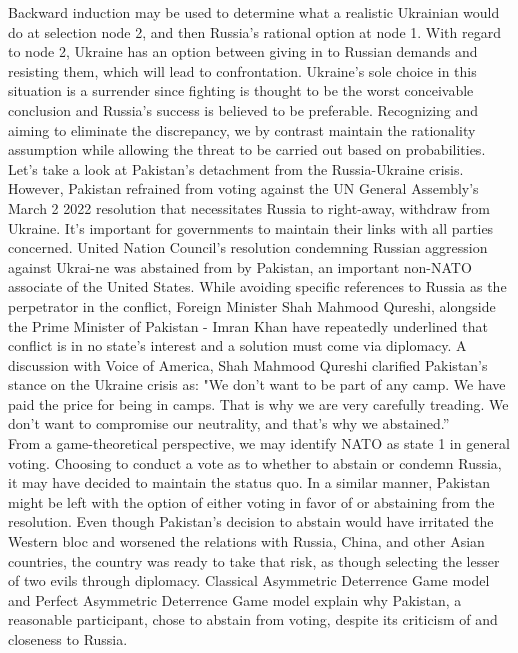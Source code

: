 \documentclass[runningheads]{llncs}
\begin{document}
Backward induction may be used to determine what a realistic Ukrainian would do at selection node 2, and then Russia's rational option at node 1. With regard to node 2, Ukraine has an option between giving in to Russian demands and resisting them, which will lead to confrontation. Ukraine's sole choice in this situation is a surrender since fighting is thought to be the worst conceivable conclusion and Russia's success is believed to be preferable. Recognizing and aiming to eliminate the discrepancy, we by contrast maintain the rationality assumption while allowing the threat to be carried out based on probabilities.\\
Let's take a look at Pakistan's detachment from the Russia-Ukraine crisis. However, Pakistan refrained from voting against the UN General Assembly's March 2 2022 resolution that necessitates Russia to right-away, withdraw from Ukraine. It's important for governments to maintain their links with all parties concerned. United Nation Council's resolution condemning Russian aggression against Ukrai-ne was abstained from by Pakistan, an important non-NATO associate of the United States. While avoiding specific references to Russia as the perpetrator in the conflict, Foreign Minister Shah Mahmood Qureshi, alongside the Prime Minister of Pakistan - Imran Khan have repeatedly underlined that conflict is in no state's interest and a solution must come via diplomacy. A discussion with Voice of America, Shah Mahmood Qureshi clarified Pakistan's stance on the Ukraine crisis as: "We don't want to be part of any camp. We have paid the price for being in camps. That is why we are very carefully treading. We don’t want to compromise our neutrality, and that’s why we abstained.” \\
From a game-theoretical perspective, we may identify NATO as state 1 in general voting. Choosing to conduct a vote as to whether to abstain or condemn Russia, it may have decided to maintain the status quo. In a similar manner, Pakistan might be left with the option of either voting in favor of or abstaining from the resolution. Even though Pakistan's decision to abstain would have irritated the Western bloc and worsened the relations with Russia, China, and other Asian countries, the country was ready to take that risk, as though selecting the lesser of two evils through diplomacy. Classical Asymmetric Deterrence Game model and Perfect Asymmetric Deterrence Game model explain why Pakistan, a reasonable participant, chose to abstain from voting, despite its criticism of and closeness to Russia.
\end{document}

